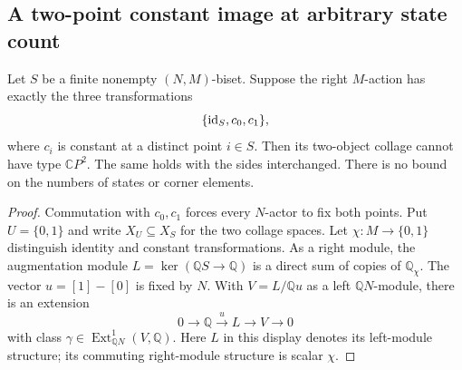 \subsection{A two-point constant image at arbitrary state count}

\begin{theorem}\label{C:two-constant-image-bisets}
Let $S$ be a finite nonempty $(N,M)$-biset.  Suppose the right
$M$-action has exactly the three transformations
\[
 \{\mathrm {id}_S,c_0,c_1\},
\]
where $c_i$ is constant at a distinct point $i\in S$.
Then its two-object collage cannot have type $\mathbb CP^2$.
The same holds with the sides interchanged.  There is no bound
on the numbers of states or corner elements.
\end{theorem}
\begin{proof}
Commutation with $c_0,c_1$ forces every $N$-actor to fix both
points.  Put $U=\{0,1\}$ and write $X_U\subseteq X_S$ for
the two collage spaces.  Let $\chi:M\to\{0,1\}$ distinguish
identity and constant transformations.  As a right module,
the augmentation module $L=\ker(\mathbb QS\to\mathbb Q)$
is a direct sum of copies of $\mathbb Q_\chi$.
The vector $u=[1]-[0]$ is fixed by $N$.  With $V=L/\mathbb Qu$
as a left $\mathbb QN$-module, there is an extension
\begin{equation}\label{C:two-constant-image-extension}
 0\longrightarrow\mathbb Q\xrightarrow{u}L
 \longrightarrow V\longrightarrow0
\end{equation}
with class $\gamma\in\operatorname{Ext}^1_{\mathbb QN}(V,\mathbb Q)$.
Here $L$ in this display denotes its left-module structure;
its commuting right-module structure is scalar $\chi$.


\end{proof}
